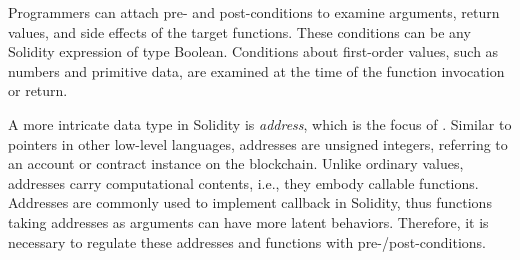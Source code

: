 
Programmers can attach pre- and  post-conditions 
to examine arguments, return values,  and side effects of the target functions. 
These conditions can be any Solidity expression of type Boolean.
Conditions about first-order values,
such as numbers and primitive data, are examined at the time of the function invocation or return.

A more intricate data type in Solidity is \emph{address}, which is the focus of \lang.
Similar to pointers in other low-level languages, addresses are unsigned integers,
referring to an account or contract instance on the blockchain.
Unlike ordinary values, addresses carry computational contents, i.e., they embody 
callable functions.
Addresses are commonly used to implement callback in Solidity,
thus functions taking addresses as arguments can have more latent behaviors.
Therefore, it is necessary to regulate these addresses and functions with pre-/post-conditions.

